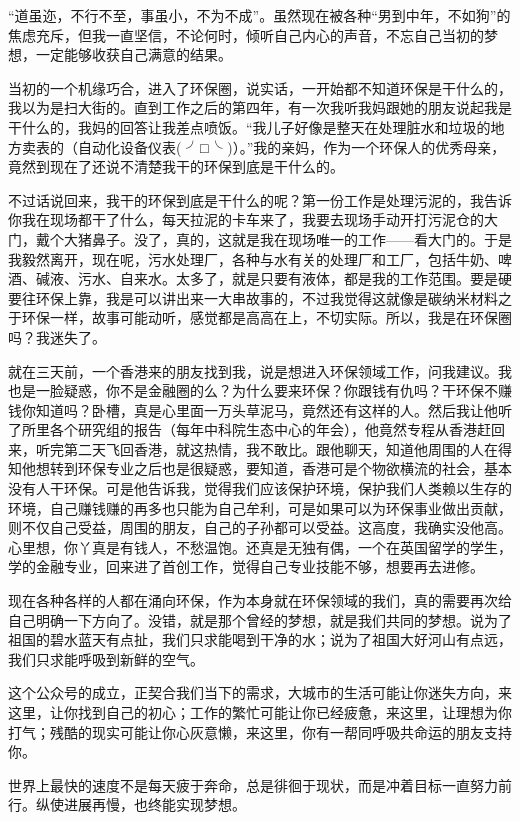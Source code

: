 \documentclass[]{book}
\begin{document}
``道虽迩，不行不至，事虽小，不为不成''。虽然现在被各种``男到中年，不如狗''的焦虑充斥，但我一直坚信，不论何时，倾听自己内心的声音，不忘自己当初的梦想，一定能够收获自己满意的结果。

当初的一个机缘巧合，进入了环保圈，说实话，一开始都不知道环保是干什么的，我以为是扫大街的。直到工作之后的第四年，有一次我听我妈跟她的朋友说起我是干什么的，我妈的回答让我差点喷饭。``我儿子好像是整天在处理脏水和垃圾的地方卖表的（自动化设备仪表(
╯□╰
)）。''我的亲妈，作为一个环保人的优秀母亲，竟然到现在了还说不清楚我干的环保到底是干什么的。

不过话说回来，我干的环保到底是干什么的呢？第一份工作是处理污泥的，我告诉你我在现场都干了什么，每天拉泥的卡车来了，我要去现场手动开打污泥仓的大门，戴个大猪鼻子。没了，真的，这就是我在现场唯一的工作------看大门的。于是我毅然离开，现在呢，污水处理厂，各种与水有关的处理厂和工厂，包括牛奶、啤酒、碱液、污水、自来水。太多了，就是只要有液体，都是我的工作范围。要是硬要往环保上靠，我是可以讲出来一大串故事的，不过我觉得这就像是碳纳米材料之于环保一样，故事可能动听，感觉都是高高在上，不切实际。所以，我是在环保圈吗？我迷失了。

就在三天前，一个香港来的朋友找到我，说是想进入环保领域工作，问我建议。我也是一脸疑惑，你不是金融圈的么？为什么要来环保？你跟钱有仇吗？干环保不赚钱你知道吗？卧槽，真是心里面一万头草泥马，竟然还有这样的人。然后我让他听了所里各个研究组的报告（每年中科院生态中心的年会），他竟然专程从香港赶回来，听完第二天飞回香港，就这热情，我不敢比。跟他聊天，知道他周围的人在得知他想转到环保专业之后也是很疑惑，要知道，香港可是个物欲横流的社会，基本没有人干环保。可是他告诉我，觉得我们应该保护环境，保护我们人类赖以生存的环境，自己赚钱赚的再多也只能为自己牟利，可是如果可以为环保事业做出贡献，则不仅自己受益，周围的朋友，自己的子孙都可以受益。这高度，我确实没他高。心里想，你丫真是有钱人，不愁温饱。还真是无独有偶，一个在英国留学的学生，学的金融专业，回来进了首创工作，觉得自己专业技能不够，想要再去进修。

现在各种各样的人都在涌向环保，作为本身就在环保领域的我们，真的需要再次给自己明确一下方向了。没错，就是那个曾经的梦想，就是我们共同的梦想。说为了祖国的碧水蓝天有点扯，我们只求能喝到干净的水；说为了祖国大好河山有点远，我们只求能呼吸到新鲜的空气。

这个公众号的成立，正契合我们当下的需求，大城市的生活可能让你迷失方向，来这里，让你找到自己的初心；工作的繁忙可能让你已经疲惫，来这里，让理想为你打气；残酷的现实可能让你心灰意懒，来这里，你有一帮同呼吸共命运的朋友支持你。

世界上最快的速度不是每天疲于奔命，总是徘徊于现状，而是冲着目标一直努力前行。纵使进展再慢，也终能实现梦想。
\end{document}
